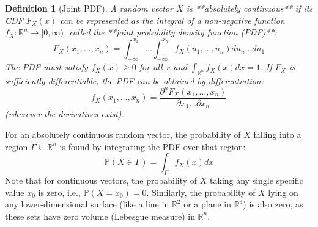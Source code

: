 \documentclass[11pt]{article}
\newtheorem{definition}[theorem]{Definition}
\theoremstyle{definition} %
\newcommand{\R}{\mathbb{R}} %
\renewcommand{\P}{\mathbb{P}} %
\begin{document}
\begin{definition}[Joint PDF]
A random vector $X$ is **absolutely continuous** if its CDF $F_X(x)$ can be represented as the integral of a non-negative function $f_X: \R^n \to [0, \infty)$, called the **joint probability density function (PDF)**:
\[ F_X(x_1, \dots, x_n) = \int_{-\infty}^{x_1} \dots \int_{-\infty}^{x_n} f_X(u_1, \dots, u_n) du_n \dots du_1 \]
The PDF must satisfy $f_X(x) \ge 0$ for all $x$ and $\int_{\R^n} f_X(x) dx = 1$.
If $F_X$ is sufficiently differentiable, the PDF can be obtained by differentiation:
\[ f_X(x_1, \dots, x_n) = \frac{\partial^n F_X(x_1, \dots, x_n)}{\partial x_1 \dots \partial x_n} \]
(wherever the derivatives exist).
\end{definition}

For an absolutely continuous random vector, the probability of $X$ falling into a region $\Gamma \subseteq \R^n$ is found by integrating the PDF over that region:
\[ \P(X \in \Gamma) = \int_{\Gamma} f_X(x) dx \]
Note that for continuous vectors, the probability of $X$ taking any single specific value $x_0$ is zero, i.e., $\P(X = x_0) = 0$. Similarly, the probability of $X$ lying on any lower-dimensional surface (like a line in $\R^2$ or a plane in $\R^3$) is also zero, as these sets have zero volume (Lebesgue measure) in $\R^n$.
\end{document}
